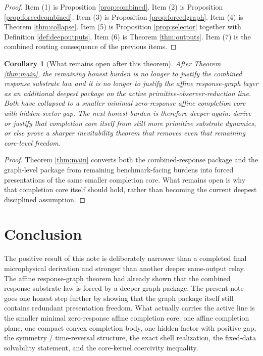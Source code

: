 \documentclass[11pt]{article}
\newtheorem{corollary}{Corollary}
\begin{document}
\begin{proof}
Item (1) is Proposition \ref{prop:combined}. Item (2) is Proposition \ref{prop:forcedcombined}. Item (3) is Proposition \ref{prop:forcedgraph}. Item (4) is Theorem \ref{thm:collapse}. Item (5) is Proposition \ref{prop:selector} together with Definition \ref{def:deepoutputs}. Item (6) is Theorem \ref{thm:outputs}. Item (7) is the combined routing consequence of the previous items.
\end{proof}

\begin{corollary}[What remains open after this theorem]
\label{cor:next}
After Theorem \ref{thm:main}, the remaining honest burden is no longer to justify the combined response substrate law and it is no longer to justify the affine response-graph layer as an additional deepest package on the active primitive-observer-reduction line. Both have collapsed to a smaller minimal zero-response affine completion core with hidden-sector gap. The next honest burden is therefore deeper again: derive or justify that completion core itself from still more primitive substrate dynamics, or else prove a sharper inevitability theorem that removes even that remaining core-level freedom.
\end{corollary}

\begin{proof}
Theorem \ref{thm:main} converts both the combined-response package and the graph-level package from remaining benchmark-facing burdens into forced presentations of the same smaller completion core. What remains open is why that completion core itself should hold, rather than becoming the current deepest disciplined assumption.
\end{proof}

\section{Conclusion}

The positive result of this note is deliberately narrower than a completed final microphysical derivation and stronger than another deeper same-output relay. The affine response-graph theorem had already shown that the combined response substrate law is forced by a deeper graph package. The present note goes one honest step further by showing that the graph package itself still contains redundant presentation freedom. What actually carries the active line is the smaller minimal zero-response affine completion core: one affine completion plane, one compact convex completion body, one hidden factor with positive gap, the symmetry / time-reversal structure, the exact shell realization, the fixed-data solvability statement, and the core-kernel coercivity inequality.
\end{document}
